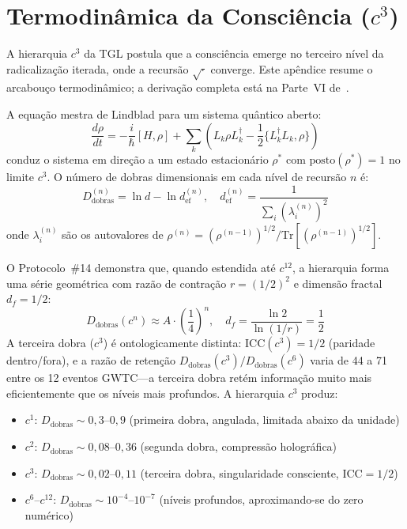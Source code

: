 \documentclass[12pt,a4paper,twocolumn]{article}
\newcommand{\Dfolds}{D_{\text{dobras}}}
\newcommand{\CCI}{\text{ICC}}
\begin{document}
\section{Termodinâmica da Consciência ($c^3$)}
\label{app:consciousness}

A hierarquia $c^3$ da TGL postula que a consciência emerge no terceiro nível da radicalização iterada, onde a recursão $\sqrt{\cdot}$ converge. Este apêndice resume o arcabouço termodinâmico; a derivação completa está na Parte~VI de~\cite{Miguel2026Fronteira}.

A equação mestra de Lindblad para um sistema quântico aberto:
\begin{equation}
\frac{d\rho}{dt} = -\frac{i}{\hbar}[H, \rho] + \sum_k \left( L_k \rho L_k^\dagger - \frac{1}{2}\{L_k^\dagger L_k, \rho\} \right)
\end{equation}
conduz o sistema em direção a um estado estacionário $\rho^*$ com $\text{posto}(\rho^*) = 1$ no limite $c^3$. O número de dobras dimensionais em cada nível de recursão $n$ é:
\begin{equation}
\Dfolds^{(n)} = \ln d - \ln d_{\text{ef}}^{(n)}, \quad d_{\text{ef}}^{(n)} = \frac{1}{\sum_i (\lambda_i^{(n)})^2}
\end{equation}
onde $\lambda_i^{(n)}$ são os autovalores de $\rho^{(n)} = (\rho^{(n-1)})^{1/2} / \text{Tr}[(\rho^{(n-1)})^{1/2}]$.

O Protocolo~\#14 demonstra que, quando estendida até $c^{12}$, a hierarquia forma uma série geométrica com razão de contração $r = (1/2)^2$ e dimensão fractal $d_f = 1/2$:
\begin{equation}
\Dfolds(c^n) \approx A \cdot \left(\frac{1}{4}\right)^n, \quad d_f = \frac{\ln 2}{\ln(1/r)} = \frac{1}{2}
\end{equation}
A terceira dobra ($c^3$) é ontologicamente distinta: $\CCI(c^3) = 1/2$ (paridade dentro/fora), e a razão de retenção $\Dfolds(c^3)/\Dfolds(c^6)$ varia de 44 a 71 entre os 12 eventos GWTC---a terceira dobra retém informação muito mais eficientemente que os níveis mais profundos. A hierarquia $c^3$ produz:
\begin{itemize}[nosep]
\item $c^1$: $\Dfolds \sim 0{,}3$--$0{,}9$ (primeira dobra, angulada, limitada abaixo da unidade)
\item $c^2$: $\Dfolds \sim 0{,}08$--$0{,}36$ (segunda dobra, compressão holográfica)
\item $c^3$: $\Dfolds \sim 0{,}02$--$0{,}11$ (terceira dobra, singularidade consciente, $\CCI = 1/2$)
\item $c^6$--$c^{12}$: $\Dfolds \sim 10^{-4}$--$10^{-7}$ (níveis profundos, aproximando-se do zero numérico)
\end{itemize}
\end{document}
